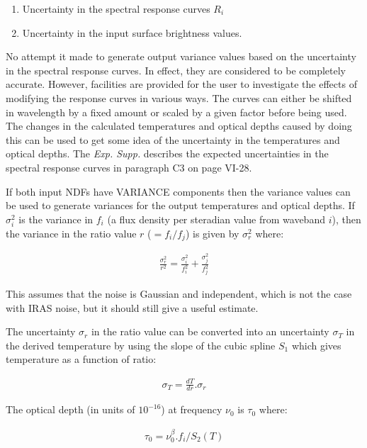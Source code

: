 \begin{enumerate}
\item Uncertainty in the spectral response curves $R_{i}$
\item Uncertainty in the input surface brightness values.
\end{enumerate}

No attempt it made to generate output variance values based on the uncertainty
in the spectral response curves. In effect, they are considered to be completely
accurate. However, facilities are provided for the user to investigate the
effects of modifying the response curves in various ways. The curves can either
be shifted in wavelength by a fixed amount or scaled by a given factor before
being used. The changes in the calculated temperatures and optical depths caused
by doing this can be used to get some idea of the uncertainty in the
temperatures and optical depths. The {\em Exp. Supp.} describes the expected
uncertainties in the spectral response curves in paragraph C3 on page VI-28. 

If both input {\small NDF}s have {\small VARIANCE} components then the variance
values can be used to generate variances for the output temperatures and optical
depths. If $\sigma^{2}_{i}$ is the variance in $f_{i}$ (a flux density per 
steradian value from waveband $i$), then the variance in the ratio value $r$ 
($=f_{i}/f_{j}$) is given by $\sigma^{2}_{r}$ where:

\begin{eqnarray*}
\frac{\sigma^{2}_{r}}{r^{2}} = \frac{\sigma^{2}_{i}}{f_{i}^{2}} + \frac{\sigma^{2}_{j}}{f_{j}^{2}} 
\end{eqnarray*}

This assumes that the noise is Gaussian and independent, which is not the case 
with {\small IRAS} noise, but it should still give a useful estimate.

The uncertainty $\sigma_{r}$ in the ratio value can be converted into an 
uncertainty $\sigma_{T}$ in the derived temperature by using the slope of the 
cubic spline $S_{1}$ which gives temperature as a function of ratio:

\begin{eqnarray*}
\sigma_{T} = \frac{dT}{dr}.\sigma_{r}
\end{eqnarray*}

The optical depth (in units of $10^{-16}$) at frequency $\nu_{0}$ is $\tau_{0}$
where: 

\begin{eqnarray*}
\tau_{0} = \nu_{0}^{\beta}.f_{i}/S_{2}( T )
\end{eqnarray*}


